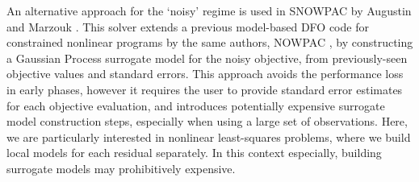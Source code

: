 
An alternative approach for the `noisy' regime is used in SNOWPAC by Augustin and Marzouk \cite{Augustin2017}.
This solver extends a previous model-based DFO code for constrained nonlinear programs by the same authors, NOWPAC \cite{Augustin2014}, by constructing a Gaussian Process surrogate model for the noisy objective, from previously-seen objective values and standard errors.
This approach avoids the performance loss in early phases, however it requires the user to provide standard error estimates for each objective evaluation, and introduces potentially expensive surrogate model construction steps, especially when using a large set of observations.
Here, we are particularly interested in nonlinear least-squares problems, where we build local models for each residual separately.
In this context especially, building surrogate models may prohibitively expensive.


